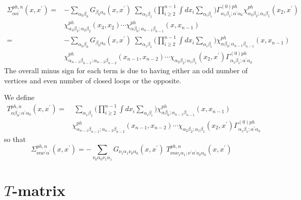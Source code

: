\begin{equation}
\begin{split}
\Sigma^{ph,n}_{\alpha\alpha^{\prime}}(x,x^{\prime}) = &
-\sum_{\alpha_0\beta_0} G_{\beta_0 \alpha_0}(x,x^{\prime}) \;
 \sum_{\alpha_1 \beta_1} \big( \prod_{i \geq 2}^{n-1} \int dx_i \sum_{\alpha_i \beta_i} \big)
\Gamma^{(0)ph}_{\alpha_1 \beta_1; \alpha^{\prime}\alpha_0}
\chi^{ph}_{\alpha_2 \beta_2; \alpha_1 \beta_1}(x_2, x^{\prime})
\\
& \chi^{ph}_{\alpha_3 \beta_3; \alpha_2 \beta_2}(x_3, x_2)
\cdots
\chi^{ph}_{\alpha \beta_0; \alpha_{n-1} \beta_{n-1}}(x,x_{n-1}) \\
= & - \sum_{\alpha_0\beta_0} G_{\beta_0 \alpha_0}(x,x^{\prime}) \;
 \sum_{\alpha_1 \beta_1}
 \big( \prod_{i \ge 2}^{n-1} \int dx_i \sum_{\alpha_i \beta_i} \big) 
 \chi^{ph}_{\alpha \beta_0; \alpha_{n-1} \beta_{n-1}}(x,x_{n-1})
\\
& \chi^{ph}_{\alpha_{n-1} \beta_{n-1}; \alpha_{n-2} \beta_{n-2}}(x_{n-1},x_{n-2})
\cdots \chi_{\alpha_2\beta_2; \alpha_1 \beta_1}(x_2, x^{\prime})
\Gamma^{(0)ph}_{\alpha_1 \beta_1; \alpha^{\prime}\alpha_0}
\end{split}
\end{equation}
The overall minus sign for each term is due to having either
an odd number of vertices and even number of closed loops or
the opposite.

We define 
\begin{equation}
\begin{split}
T^{ph,n}_{\alpha\beta_0; \alpha^{\prime}\alpha_0}(x,x^{\prime}) =
& \;
 \sum_{\alpha_1 \beta_1} \big( \prod_{i \ge 2}^{n-1} 
\int dx_i \sum_{\alpha_i \beta_i} \big) 
\chi^{ph}_{\alpha \beta_0; \alpha_{n-1} \beta_{n-1}}(x,x_{n-1})
\\ &
\chi^{ph}_{\alpha_{n-1} \beta_{n-1}; \alpha_{n-2} \beta_{n-2}}(x_{n-1},x_{n-2})
\cdots \chi_{\alpha_2\beta_2; \alpha_1 \beta_1}(x_2, x^{\prime})
\Gamma^{(0)ph}_{\alpha_1 \beta_1; \alpha^{\prime}\alpha_0}
\end{split}
\end{equation}
so that
\begin{equation}
\Sigma^{ph,n}_{\nu\alpha \nu^{\prime}\alpha^{\prime}}(x,x^{\prime}) =
-\sum_{\nu_0\alpha_0 \nu_1\alpha_1}
G_{\nu_1 \alpha_1 \nu_0 \alpha_0}(x,x^{\prime})\; 
T^{ph,n}_{\nu\alpha \nu_1 \alpha_1; \nu^{\prime}\alpha^{\prime} \nu_0\alpha_0}(x,x^{\prime})
\end{equation}

\section{$T$-matrix}

